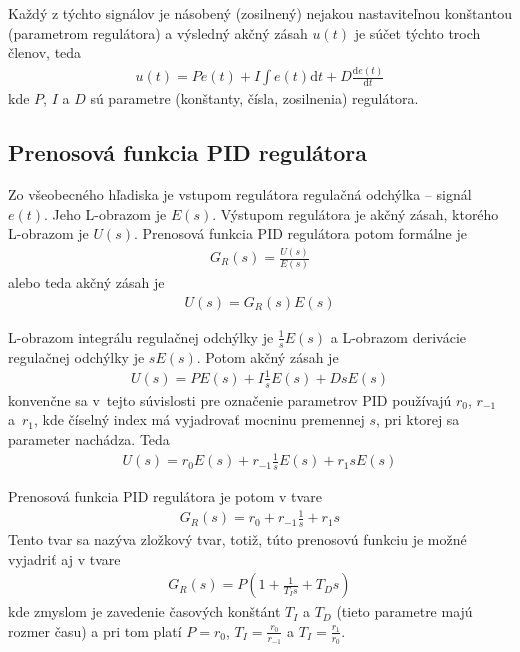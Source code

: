\documentclass[a4paper, 10pt, ]{article}
\begin{document}
Každý z týchto signálov je násobený (zosilnený) nejakou nastaviteľnou konštantou (parametrom regulátora) a výsledný akčný zásah $u(t)$ je súčet týchto troch členov, teda
\begin{align}
    u(t) = P e(t) + I  \int e(t) \text{d}t + D  \frac{\text{d}e(t)}{\text{d}t}
\end{align}
kde $P$, $I$ a $D$ sú parametre (konštanty, čísla, zosilnenia) regulátora.







\subsection{Prenosová funkcia PID regulátora}

Zo všeobecného hľadiska je vstupom regulátora regulačná odchýlka -- signál $e(t)$. Jeho L-obrazom je $E(s)$. Výstupom regulátora je akčný zásah, ktorého L-obrazom je $U(s)$. Prenosová funkcia PID regulátora potom formálne je
\begin{align}
    G_R(s) = \frac{U(s)}{E(s)}
\end{align}
alebo teda akčný zásah je
\begin{align}
    U(s) = G_R(s) E(s)
\end{align}

L-obrazom integrálu regulačnej odchýlky je $\frac{1}{s} E(s)$ a L-obrazom derivácie regulačnej odchýlky je $sE(s)$. Potom akčný zásah je
\begin{align}
    U(s) = P E(s) + I  \frac{1}{s} E(s) + D  sE(s)
\end{align}
konvenčne sa v~tejto súvislosti pre označenie parametrov PID používajú $r_0$, $r_{-1}$ a~$r_1$, kde číselný index má vyjadrovať mocninu premennej $s$, pri ktorej sa parameter nachádza. Teda
\begin{align}
    U(s) = r_0 E(s) + r_{-1}  \frac{1}{s} E(s) + r_1  sE(s)
\end{align}

Prenosová funkcia PID regulátora je potom v tvare
\begin{align} \label{tfPID}
    G_R(s) = r_0  + r_{-1}  \frac{1}{s}  + r_1  s
\end{align}
Tento tvar sa nazýva zložkový tvar, totiž, túto prenosovú funkciu je možné vyjadriť aj v tvare
\begin{align}
    G_R(s) = P \left( 1 +  \frac{1}{T_I s}  +  T_D  s \right)
\end{align}
kde zmyslom je zavedenie časových konštánt $T_I$ a $T_D$ (tieto parametre majú rozmer času) a pri tom platí $P = r_0$, $T_I = \frac{r_0}{r_{-1}}$ a $T_I = \frac{r_1}{r_0}$.
\end{document}
